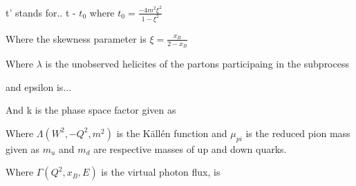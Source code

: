         
        
        
        t' stands for.. t - $t_0$ where $t_0 = \frac{-4m^2\xi^2}{1-\xi^2}$
        
           Where the skewness parameter is $\xi = \frac{x_B}{2-x_B}$ 
           
        
        
            Where $\lambda$ is the unobserved helicites of the partons participaing in the subprocess
            
         and epsilon is... 
            
            
            
            
         
               
            And k is the phase space factor given as 
            
                Where $\Lambda(W^2,-Q^2,m^2)$ is the Källén function and $\mu_{pi}$ is the reduced pion mass given as 
            $m_u$ and $m_d$ are respective masses of up and down quarks.
            
             Where $\Gamma (Q^2, x_B, E)$ is the virtual photon flux, is 

\fi
